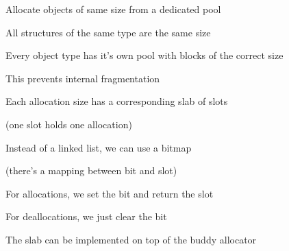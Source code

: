 \begin{slide}
  

  Allocate objects of same size from a dedicated pool

  \leftspace{}All structures of the same type are the same size
  \medskip

  Every object type has it's own pool with blocks of the correct size

  \leftspace{}This prevents internal fragmentation

\end{slide}

\begin{slide}


  Each allocation size has a corresponding slab of slots
  
  (one slot holds one allocation)
  \medskip

  Instead of a linked list, we can use a bitmap
  
  (there's a mapping between bit and slot)

  \leftspace{}For allocations, we set the bit and return the slot

  \leftspace{}For deallocations, we just clear the bit
  \medskip

  The slab can be implemented on top of the buddy allocator

\end{slide}

